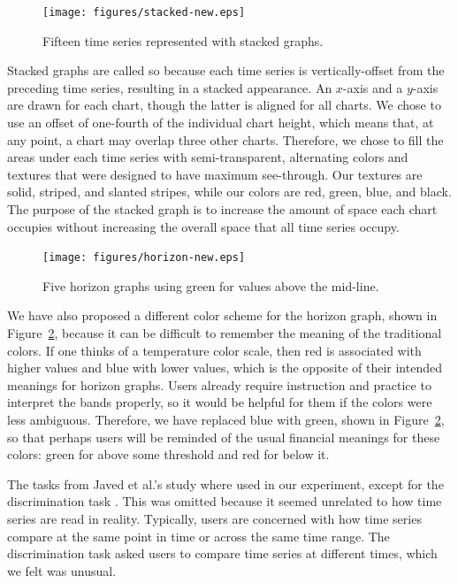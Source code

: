 \documentclass{article}
\begin{document}
\begin{figure}[h]
	\centering
	\texttt{[image: figures/stacked-new.eps]}
	\caption{Fifteen time series represented with stacked graphs.}
	\label{fig:stackedGraph}
\end{figure}

Stacked graphs are called so because each time series is vertically-offset from the preceding time series, resulting in a stacked appearance.  An $x$-axis and a $y$-axis are drawn for each chart, though the latter is aligned for all charts.  We chose to use an offset of one-fourth of the individual chart height, which means that, at any point, a chart may overlap three other charts.  Therefore, we chose to fill the areas under each time series with semi-transparent, alternating colors and textures that were designed to have maximum see-through.  Our textures are solid, striped, and slanted stripes, while our colors are red, green, blue, and black. The purpose of the stacked graph is to increase the amount of space each chart occupies without increasing the overall space that all time series occupy.

\begin{figure}[h]
	\centering
	\texttt{[image: figures/horizon-new.eps]}
	\caption{Five horizon graphs using green for values above the mid-line.}
	\label{fig:newHorizon}
\end{figure}

We have also proposed a different color scheme for the horizon graph, shown in Figure~\ref{fig:newHorizon}, because it can be difficult to remember the meaning of the traditional colors.  If one thinks of a temperature color scale, then red is associated with higher values and blue with lower values, which is the opposite of their intended meanings for horizon graphs.  Users already require instruction and practice to interpret the bands properly, so it would be helpful for them if the colors were less ambiguous.  Therefore, we have replaced blue with green, shown in Figure~\ref{fig:newHorizon}, so that perhaps users will be reminded of the usual financial meanings for these colors: green for above some threshold and red for below it.

The tasks from Javed et al.'s study where used in our experiment, except for the discrimination task \cite{javed2010}.  This was omitted because it seemed unrelated to how time series are read in reality.  Typically, users are concerned with how time series compare at the same point in time or across the same time range.  The discrimination task asked users to compare time series at different times, which we felt was unusual.
\end{document}
